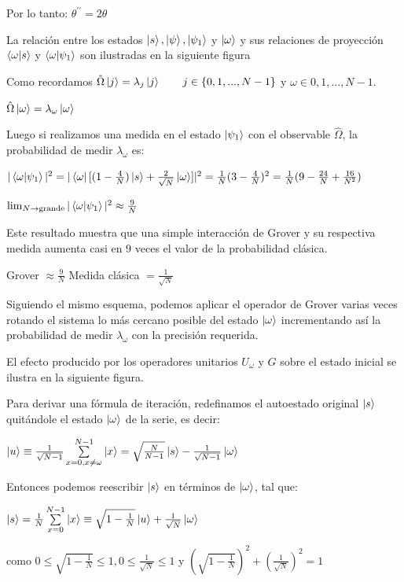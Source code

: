 \documentclass[11pt, spanish]{report}
\begin{document}
Por lo tanto: $\theta^{\prime\prime} = 2\theta$

La relación entre los estados $\ket{s}, \ket{\psi}, \ket{\psi_1}$ y $\ket{\omega}$
y sus relaciones de proyección $\braket{\omega}{s}$ y $\braket{\omega}{\psi_1}$
son ilustradas en la siguiente figura

Como recordamos $\hat{\Omega}\ket{j} = \lambda_j \ket{j} \qquad j \in
\{0,1,...,N-1\}$ y $\omega \in {0,1,...,N-1}$.

$\hat{\Omega} \ket{\omega} = \lambda_\omega \ket{\omega}$

Luego si realizamos una medida en el estado $\ket{\psi_1}$ con el observable
$\hat{\Omega}$, la probabilidad de medir $\lambda_\omega$ es:

$|\braket{\omega}{\psi_1}|^2 = |\bra{\omega} [(1-\frac{4}{N})\ket{s} +
\frac{2}{\sqrt{N}} \ket{\omega}]|^2 = \frac{1}{N}(3-\frac{4}{N})^2 = \frac{1}{N}
(9 - \frac{24}{N} + \frac{16}{N^2})$

$\lim_{N \to \text{grande}} |\braket{\omega}{\psi_1}|^2 \approx \frac{9}{N}$

Este resultado muestra que una simple interacción de Grover y su respectiva
medida aumenta casi en 9 veces el valor de la probabilidad clásica.

Grover $\approx \frac{9}{N}$ Medida clásica $= \frac{1}{\sqrt{N}}$

Siguiendo el mismo esquema, podemos aplicar el operador de Grover varias veces
rotando el sistema lo más cercano posible del estado $\ket{\omega}$
incrementando así la probabilidad de medir $\lambda_\omega$ con la precisión
requerida.

El efecto producido por los operadores unitarios $U_\omega$ y $G$ sobre el
estado inicial se ilustra en la siguiente figura.


Para derivar una fórmula de iteración, redefinamos el autoestado original
$\ket{s}$ quitándole el estado $\ket{\omega}$ de la serie, es decir:

$\ket{u} \equiv \frac{1}{\sqrt{N-1}} \sum\limits_{x=0, x\neq\omega}^{N-1}
\ket{x} = \sqrt{\frac{N}{N-1}} \ket{s} - \frac{1}{\sqrt{N-1}} \ket{\omega}$

Entonces podemos reescribir $\ket{s}$ en términos de $\ket{\omega}$, tal que:

$\ket{s} = \frac{1}{N} \sum\limits_{x=0}^{N-1} \ket{x} \equiv
\sqrt{1-\frac{1}{N}} \ket{u} + \frac{1}{\sqrt{N}} \ket{\omega}$

como $0\leq \sqrt{1-\frac{1}{N}} \leq 1, 0\leq \frac{1}{\sqrt{N}} \leq 1$ y
$(\sqrt{1-\frac{1}{N}})^2 + (\frac{1}{\sqrt{N}})^2 = 1$
\end{document}
